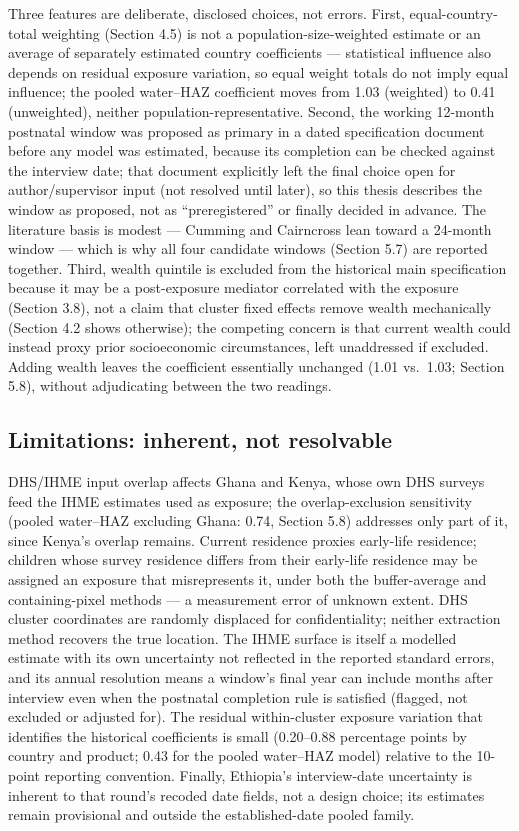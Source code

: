 Three features are deliberate, disclosed choices, not errors. First, equal-country-total weighting (Section 4.5) is not a population-size-weighted estimate or an average of separately estimated country coefficients --- statistical influence also depends on residual exposure variation, so equal weight totals do not imply equal influence; the pooled water--HAZ coefficient moves from 1.03 (weighted) to 0.41 (unweighted), neither population-representative. Second, the working 12-month postnatal window was proposed as primary in a dated specification document before any model was estimated, because its completion can be checked against the interview date; that document explicitly left the final choice open for author/supervisor input (not resolved until later), so this thesis describes the window as proposed, not as ``preregistered'' or finally decided in advance. The literature basis is modest --- Cumming and Cairncross \autocite*{CummingCairncross2016} lean toward a 24-month window --- which is why all four candidate windows (Section 5.7) are reported together. Third, wealth quintile is excluded from the historical main specification because it may be a post-exposure mediator correlated with the exposure (Section 3.8), not a claim that cluster fixed effects remove wealth mechanically (Section 4.2 shows otherwise); the competing concern is that current wealth could instead proxy prior socioeconomic circumstances, left unaddressed if excluded. Adding wealth leaves the coefficient essentially unchanged (1.01 vs.~1.03; Section 5.8), without adjudicating between the two readings.

\subsection{Limitations: inherent, not resolvable}\label{sec:6.5}

DHS/IHME input overlap affects Ghana and Kenya, whose own DHS surveys feed the IHME estimates used as exposure; the overlap-exclusion sensitivity (pooled water--HAZ excluding Ghana: 0.74, Section 5.8) addresses only part of it, since Kenya's overlap remains. Current residence proxies early-life residence; children whose survey residence differs from their early-life residence may be assigned an exposure that misrepresents it, under both the buffer-average and containing-pixel methods --- a measurement error of unknown extent. DHS cluster coordinates are randomly displaced for confidentiality; neither extraction method recovers the true location. The IHME surface is itself a modelled estimate with its own uncertainty not reflected in the reported standard errors, and its annual resolution means a window's final year can include months after interview even when the postnatal completion rule is satisfied (flagged, not excluded or adjusted for). The residual within-cluster exposure variation that identifies the historical coefficients is small (0.20--0.88 percentage points by country and product; 0.43 for the pooled water--HAZ model) relative to the 10-point reporting convention. Finally, Ethiopia's interview-date uncertainty is inherent to that round's recoded date fields, not a design choice; its estimates remain provisional and outside the established-date pooled family.

